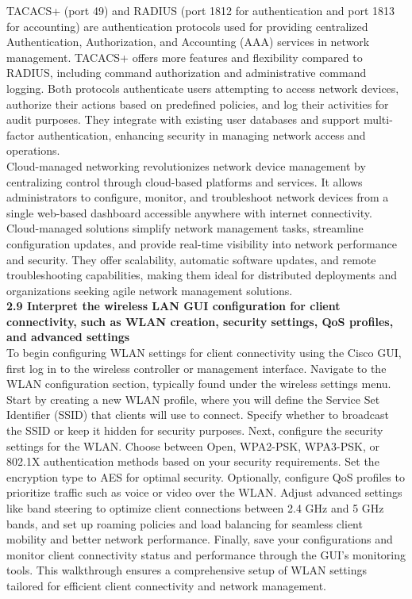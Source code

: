 \documentclass{article}
\begin{document}
	TACACS+ (port 49) and RADIUS (port 1812 for authentication and port 1813 for accounting) are authentication protocols used for providing centralized Authentication, Authorization, and Accounting (AAA) services in network management. TACACS+ offers more features and flexibility compared to RADIUS, including command authorization and administrative command logging. Both protocols authenticate users attempting to access network devices, authorize their actions based on predefined policies, and log their activities for audit purposes. They integrate with existing user databases and support multi-factor authentication, enhancing security in managing network access and operations.\\
	
	Cloud-managed networking revolutionizes network device management by centralizing control through cloud-based platforms and services. It allows administrators to configure, monitor, and troubleshoot network devices from a single web-based dashboard accessible anywhere with internet connectivity. Cloud-managed solutions simplify network management tasks, streamline configuration updates, and provide real-time visibility into network performance and security. They offer scalability, automatic software updates, and remote troubleshooting capabilities, making them ideal for distributed deployments and organizations seeking agile network management solutions.\\
  
\textbf{2.9 Interpret the wireless LAN GUI configuration for client connectivity, such as WLAN creation, security settings, QoS profiles, and advanced settings}\\

	To begin configuring WLAN settings for client connectivity using the Cisco GUI, first log in to the wireless controller or management interface. Navigate to the WLAN configuration section, typically found under the wireless settings menu. Start by creating a new WLAN profile, where you will define the Service Set Identifier (SSID) that clients will use to connect. Specify whether to broadcast the SSID or keep it hidden for security purposes. Next, configure the security settings for the WLAN. Choose between Open, WPA2-PSK, WPA3-PSK, or 802.1X authentication methods based on your security requirements. Set the encryption type to AES for optimal security. Optionally, configure QoS profiles to prioritize traffic such as voice or video over the WLAN. Adjust advanced settings like band steering to optimize client connections between 2.4 GHz and 5 GHz bands, and set up roaming policies and load balancing for seamless client mobility and better network performance. Finally, save your configurations and monitor client connectivity status and performance through the GUI’s monitoring tools. This walkthrough ensures a comprehensive setup of WLAN settings tailored for efficient client connectivity and network management.
\end{document}

